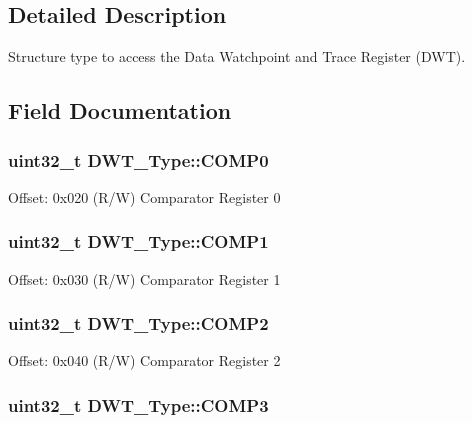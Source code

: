 \subsection{Detailed Description}
Structure type to access the Data Watchpoint and Trace Register (D\-W\-T). 

\subsection{Field Documentation}
\hypertarget{structDWT__Type_a7cf71ff4b30a8362690fddd520763904}{
\subsubsection[{C\-O\-M\-P0}]{ uint32\-\_\-t D\-W\-T\-\_\-\-Type\-::\-C\-O\-M\-P0}}\label{structDWT__Type_a7cf71ff4b30a8362690fddd520763904}
Offset\-: 0x020 (R/\-W) Comparator Register 0 \hypertarget{structDWT__Type_a4a5bb70a5ce3752bd628d5ce5658cb0c}{
\subsubsection[{C\-O\-M\-P1}]{ uint32\-\_\-t D\-W\-T\-\_\-\-Type\-::\-C\-O\-M\-P1}}\label{structDWT__Type_a4a5bb70a5ce3752bd628d5ce5658cb0c}
Offset\-: 0x030 (R/\-W) Comparator Register 1 \hypertarget{structDWT__Type_a8927aedbe9fd6bdae8983088efc83332}{
\subsubsection[{C\-O\-M\-P2}]{ uint32\-\_\-t D\-W\-T\-\_\-\-Type\-::\-C\-O\-M\-P2}}\label{structDWT__Type_a8927aedbe9fd6bdae8983088efc83332}
Offset\-: 0x040 (R/\-W) Comparator Register 2 \hypertarget{structDWT__Type_a3df15697eec279dbbb4b4e9d9ae8b62f}{
\subsubsection[{C\-O\-M\-P3}]{ uint32\-\_\-t D\-W\-T\-\_\-\-Type\-::\-C\-O\-M\-P3}}\label{structDWT__Type_a3df15697eec279dbbb4b4e9d9ae8b62f}

